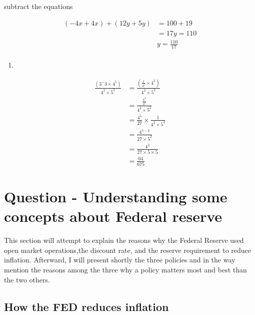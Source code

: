 \documentclass[
]{article}
\begin{document}
subtract the equations

\begin{align*}
(-4x+4x)+(12y+5y)&=100+19\\
&=17y=110\\
&y= \frac{110}{17}\\
\end{align*}

\begin{enumerate}
\def\labelenumi{\alph{enumi}.}
\setcounter{enumi}{5}
\item
\end{enumerate}

\begin{align*} \frac{(3^-3\times 4^5)}{4^2\times 5^2} &=\frac{(\frac{1}{3^3} \times 4^5)}{4^2 \times 5^2}\\
&=\frac{\frac{4^5}{3^3}} {4^2\times 5^2}\\
&=\frac{4^5}{27}\times \frac{1}{4^2 \times 5^2}\\
&=\frac{4^{5-2}}{27\times5^2}\\
&=\frac{4^3}{27\times 5 \times 5}\\
&=\frac{64}{675}
\end{align*}

\hypertarget{question---understanding-some-concepts-about-federal-reserve}{%
\section{Question - Understanding some concepts about Federal
reserve}\label{question---understanding-some-concepts-about-federal-reserve}}

This section will attempt to explain the reasons why the Federal Reserve
used open market operations,the discount rate, and the reserve
requirement to reduce inflation. Afterward, I will present shortly the
three policies and in the way mention the reasons among the three why a
policy matters most and best than the two others.

\hypertarget{how-the-fed-reduces-inflation}{%
\subsection{How the FED reduces
inflation}\label{how-the-fed-reduces-inflation}}
\end{document}
